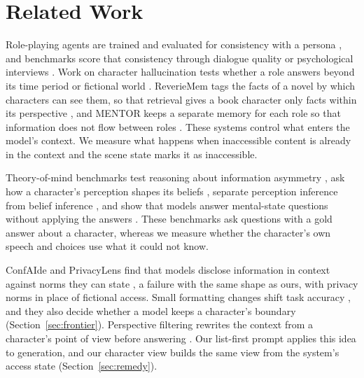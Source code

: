 \documentclass[11pt]{article}
\begin{document}
\section{Related Work}
Role-playing agents are trained and evaluated for consistency with a persona \citep{shao-etal-2023-character,wang-etal-2024-rolellm}, and benchmarks score that consistency through dialogue quality or psychological interviews \citep{tu-etal-2024-charactereval,wang-etal-2024-incharacter}. Work on character hallucination tests whether a role answers beyond its time period or fictional world \citep{ahn-etal-2024-timechara,han2026charm}. ReverieMem tags the facts of a novel by which characters can see them, so that retrieval gives a book character only facts within its perspective \citep{tang2026staying}, and MENTOR keeps a separate memory for each role so that information does not flow between roles \citep{zhu2026mentor}. These systems control what enters the model's context. We measure what happens when inaccessible content is already in the context and the scene state marks it as inaccessible.

Theory-of-mind benchmarks test reasoning about information asymmetry \citep{kim-etal-2023-fantom}, ask how a character's perception shapes its beliefs \citep{gandhi2023bigtom,xu-etal-2024-opentom}, separate perception inference from belief inference \citep{jung-etal-2024-perceptions}, and show that models answer mental-state questions without applying the answers \citep{gu2026simpletom}. These benchmarks ask questions with a gold answer about a character, whereas we measure whether the character's own speech and choices use what it could not know.

ConfAIde and PrivacyLens find that models disclose information in context against norms they can state \citep{mireshghallah2024confaide,shao2024privacylens}, a failure with the same shape as ours, with privacy norms in place of fictional access. Small formatting changes shift task accuracy \citep{sclar2024quantifying}, and they also decide whether a model keeps a character's boundary (Section~\ref{sec:frontier}). Perspective filtering rewrites the context from a character's point of view before answering \citep{wilf-etal-2024-think}. Our list-first prompt applies this idea to generation, and our character view builds the same view from the system's access state (Section~\ref{sec:remedy}).
\end{document}
